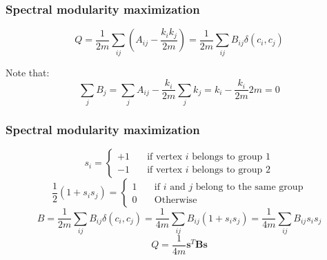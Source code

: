 \documentclass{beamer}
\begin{document}
\begin{frame}
    \frametitle{Spectral modularity maximization}
    \centering
    $$Q = \frac{1}{2m}\sum\limits_{ij}\left(A_{ij}-\frac{k_ik_j}{2m}\right) = \frac{1}{2m}\sum\limits_{ij}B_{ij}\delta(c_i,c_j)$$

    \vspace{2em}
    \justifying
    Note that:
    $$\sum\limits_{j}B_{j} = \sum\limits_jA_{ij}-\frac{k_i}{2m}\sum\limits_{j}k_j = k_i-\frac{k_i}{2m}2m = 0$$
\end{frame}
\begin{frame}
    \frametitle{Spectral modularity maximization}
    \centering
$$s_i = \begin{cases}+1&\quad \text{if vertex $i$ belongs to group $1$}\\-1 &\quad \text{if vertex $i$ belongs to group $2$}\end{cases}$$
\pause
    \vspace{1em}
$$\frac{1}{2}(1+s_is_j) = \begin{cases}1&\quad\text{if $i$ and $j$ belong to the same group}\\0&\quad\text{Otherwise}\end{cases}$$
\pause
    \vspace{1em}
$$B = \frac{1}{2m}\sum\limits_{ij}B_{ij}\delta(c_i,c_j) = \frac{1}{4m}\sum\limits_{ij}B_{ij}(1 + s_is_j) = \frac{1}{4m}\sum\limits_{ij}B_{ij}s_is_j$$
    \vspace{1em}
$$Q = \frac{1}{4m}{\mathbf s}^T{\mathbf B}{\mathbf s}$$
\end{frame}
\end{document}
